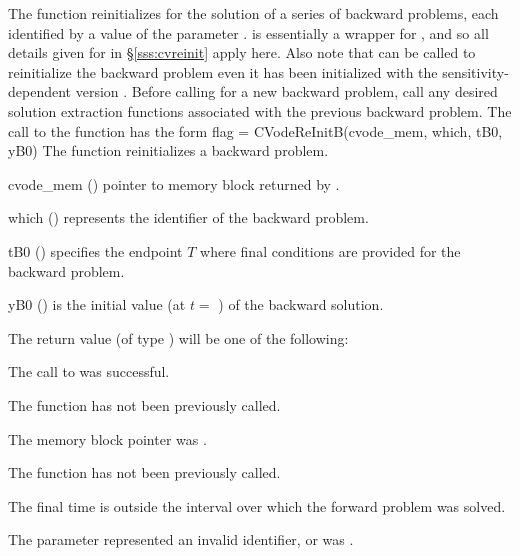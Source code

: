 The function  reinitializes {\cvodes} for the solution of a series
of backward problems, each identified by a value of the parameter .
 is essentially a wrapper for , and so
all details given for  in \S\ref{sss:cvreinit} apply
here.  Also note that  can be called to
reinitialize the backward problem even it has been initialized with the
sensitivity-dependent version .
Before calling  for a new backward problem, call any
desired solution extraction functions  associated with the
previous backward problem.
The call to the  function has the form
{
  flag = CVodeReInitB(cvode\_mem, which, tB0, yB0)
}
{
  The function  reinitializes a {\cvodes} backward problem.
}
{
  \begin{args}
  \item[cvode\_mem] ()
    pointer to {\cvodes} memory block returned by .
  \item[which] ()
    represents the identifier of the backward problem.
  \item[tB0] ()
    specifies the endpoint $T$ where final conditions are provided for the
    backward problem.
  \item[yB0] ()
    is the initial value (at $t =$ ) of the backward solution.
  \end{args}
}
{
  The return value  (of type ) will be one of the following:
  \begin{args}
  \item[\Id{CV\_SUCCESS}]
    The call to  was successful.
  \item[\Id{CV\_NO\_MALLOC}]
    The function  has not been previously called.
  \item[\Id{CV\_MEM\_NULL}]
    The  memory block pointer was .
  \item[\Id{CV\_NO\_ADJ}]
    The function  has not been previously called.
  \item[\Id{CV\_BAD\_TB0}]
    The final time  is outside the interval over which the forward problem
    was solved.
  \item[\Id{CV\_ILL\_INPUT}]
    The parameter  represented an invalid identifier, or
     was .
  \end{args}
}
{}

